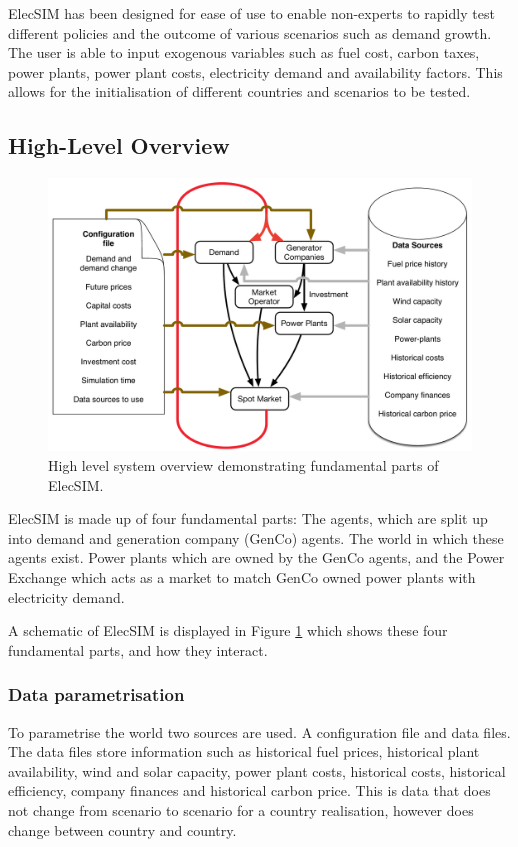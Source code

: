 
ElecSIM has been designed for ease of use to enable non-experts to rapidly test different policies and the outcome of various scenarios such as demand growth. The user is able to input exogenous variables such as fuel cost, carbon taxes, power plants, power plant costs, electricity demand and availability factors. This allows for the initialisation of different countries and scenarios to be tested.


\subsection{High-Level Overview}

\begin{figure}
	\centering
	\includegraphics[width=0.97\linewidth]{figures/System_overview}
	\caption{High level system overview demonstrating fundamental parts of ElecSIM.}
	\label{fig:systemoverview}
\end{figure}




ElecSIM is made up of four fundamental parts: The agents, which are split up into demand and generation company (GenCo) agents. The world in which these agents exist. Power plants which are owned by the GenCo agents, and the Power Exchange which acts as a market to match GenCo owned power plants with electricity demand.

A schematic of ElecSIM is displayed in Figure \ref{fig:systemoverview} which shows these four fundamental parts, and how they interact.

\subsubsection{Data parametrisation} To parametrise the world two sources are used. A configuration file and data files. The data files store information such as historical fuel prices, historical plant availability, wind and solar capacity, power plant costs, historical costs, historical efficiency, company finances and historical carbon price. This is data that does not change from scenario to scenario for a country realisation, however does change between country and country.

